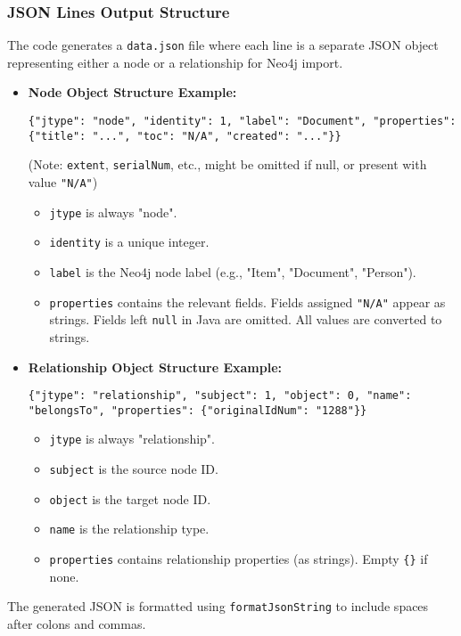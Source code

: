 \subsubsection{JSON Lines Output Structure}
The code generates a \texttt{data.json} file where each line is a separate JSON object representing either a node or a relationship for Neo4j import.

\begin{itemize}
    \item \textbf{Node Object Structure Example:}
    \begin{lstlisting}[breaklines=true]
    {"jtype": "node", "identity": 1, "label": "Document", "properties": {"title": "...", "toc": "N/A", "created": "..."}}
    \end{lstlisting}
     (Note: \texttt{extent}, \texttt{serialNum}, etc., might be omitted if null, or present with value \texttt{"N/A"})
    \begin{itemize}
            \item \texttt{jtype} is always "node".
            \item \texttt{identity} is a unique integer.
            \item \texttt{label} is the Neo4j node label (e.g., "Item", "Document", "Person").
            \item \texttt{properties} contains the relevant fields. Fields assigned \texttt{"N/A"} appear as strings. Fields left \texttt{null} in Java are omitted. All values are converted to strings.
        \end{itemize}

    \item \textbf{Relationship Object Structure Example:}
    \begin{lstlisting}[breaklines=true]
    {"jtype": "relationship", "subject": 1, "object": 0, "name": "belongsTo", "properties": {"originalIdNum": "1288"}}
    \end{lstlisting}
    \begin{itemize}
            \item \texttt{jtype} is always "relationship".
            \item \texttt{subject} is the source node ID.
            \item \texttt{object} is the target node ID.
            \item \texttt{name} is the relationship type.
            \item \texttt{properties} contains relationship properties (as strings). Empty \texttt{\{\}} if none.
        \end{itemize}
\end{itemize}
The generated JSON is formatted using \texttt{formatJsonString} to include spaces after colons and commas.


